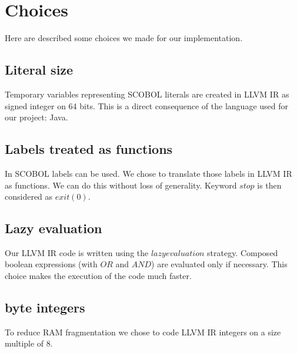 \newpage\cleardoublepage{}
\section{Choices}

Here are described some choices we made for our implementation.


\subsection{Literal size}

Temporary variables representing SCOBOL literals are created in LLVM IR as signed integer on 64 bits. This is a direct consequence of the language used for our project: Java.


\subsection{Labels treated as functions}

In SCOBOL labels can be used. We chose to translate those labels in LLVM IR as functions. We can do this without loss of generality. Keyword $stop$ is then considered as $exit(0)$.

\subsection{Lazy evaluation}

Our LLVM IR code is written using the $lazy evaluation$ strategy. Composed boolean expressions (with $OR$ and $AND$) are evaluated only if necessary. This choice makes the execution of the code much faster.

\subsection{byte integers}

To reduce RAM fragmentation we chose to code LLVM IR integers on a size multiple of 8.



